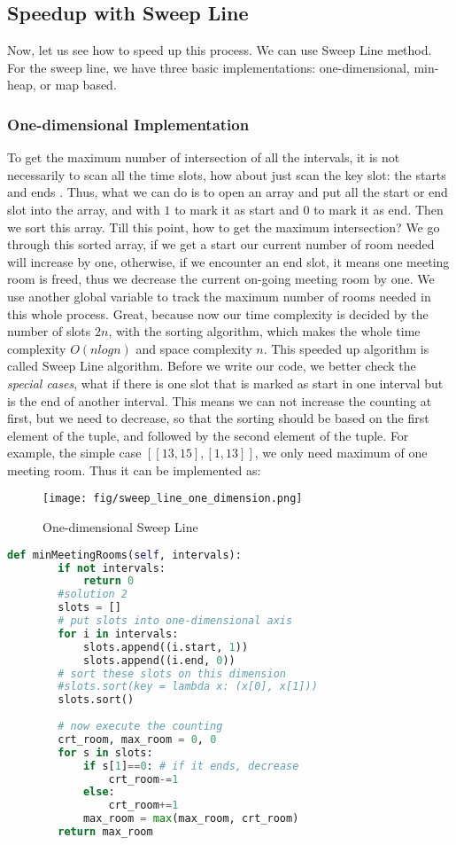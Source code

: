 \documentclass[../main.tex]{subfiles}
\begin{document}
\subsection{Speedup with Sweep Line}
Now, let us see how to speed up this process. We can use Sweep Line method. For the sweep line, we have three basic implementations: one-dimensional, min-heap, or map based. 
\subsubsection{One-dimensional Implementation}
 To get the maximum number of intersection of all the intervals, it is not necessarily to scan all the time slots, how about just scan the key slot: the starts and ends . Thus, what we can do is to open an array and put all the start or end slot into the array, and with $1$ to mark it as start and $0$ to mark it as end. Then we sort this array. Till this point, how to get the maximum intersection? We go through this sorted array, if we get a start our current number of room needed will increase by one, otherwise, if we encounter an end slot, it means one meeting room is freed, thus we decrease the current on-going meeting room by one. We use another global variable to track the maximum number of rooms needed in this whole process. Great, because now our time complexity is decided by the number of slots $2n$, with the sorting algorithm, which makes the whole time complexity $O(nlogn)$ and space complexity $n$. This speeded up algorithm is called Sweep Line algorithm. Before we write our code, we better check the \textit{special cases}, what if there is one slot that is marked as start in one interval but is the end of another interval. This means we can not increase the counting at first, but we need to decrease, so that the sorting should be based on the first element of the tuple, and followed by the second element of the tuple. For example, the simple case $[[13,15],[1,13]]$, we only need maximum of one meeting room. Thus it can be implemented as:
\begin{figure}[h]
    \centering
    \texttt{[image: fig/sweep\_line\_one\_dimension.png]}
    \caption{One-dimensional Sweep Line}
    \label{fig:one_dim_sl}
\end{figure}
\begin{lstlisting}[language=Python]
 def minMeetingRooms(self, intervals):
        if not intervals:
            return 0       
        #solution 2
        slots = []
        # put slots into one-dimensional axis
        for i in intervals:
            slots.append((i.start, 1))
            slots.append((i.end, 0))
        # sort these slots on this dimension
        #slots.sort(key = lambda x: (x[0], x[1]))
        slots.sort()
        
        # now execute the counting
        crt_room, max_room = 0, 0
        for s in slots:
            if s[1]==0: # if it ends, decrease
                crt_room-=1
            else:
                crt_room+=1
            max_room = max(max_room, crt_room)
        return max_room
\end{lstlisting}
\end{document}
